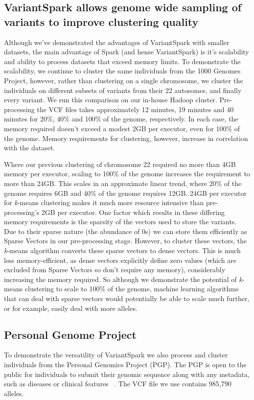 \documentclass{bmcart}
\newcommand{\variantSpark}{{\sc VariantSpark}}
\newcommand{\kMeans}{\textit{k}-means}
\begin{document}
\subsection*{\variantSpark{} allows genome wide sampling of variants to improve clustering quality}

Although we've demonstrated the advantages of \variantSpark{} with smaller datasets, the main advantage of {\sc Spark} (and hense \variantSpark) is it's scalability and ability to process datasets that exceed memory limits.
To demonstrate the scalability, we continue to cluster the same individuals from the 1000 Genomes Project, however, rather than clustering on a single chromosome, we cluster the individuals on different subsets of variants from their 22 autosomes, and finally every variant.
We run this comparison on our in-house Hadoop cluster. Pre-processing the VCF files takes approximately 12 minutes, 19 minutes and 40 minutes for 20\%, 40\% and 100\% of the genome, respectively.
In each case, the memory required doesn't exceed a modest 2GB per executor, even for 100\% of the genome. Memory requirements for clustering, however, increase in correlation with the dataset. 

Where our previous clustering of chromosome 22 required no more than 4GB memory per executor, scaling to 100\% of the genome increases the requirement to more than 24GB. This scales in an approximate linear trend, where 20\% of the genome requires 6GB and 40\% of the genome requires 12GB.
24GB per executor for \kMeans{} clustering makes it much more resource intensive than pre-processing's 2GB per executor. 
One factor which results in these differing memory requirements is the sparsity of the vectors used to store the variants. Due to their sparse nature (the abundance of 0s) we can store them efficiently as Sparse Vectors in our pre-processing stage. However, to cluster these vectors, the \kMeans{} algorithm converts these sparse vectors to dense vectors. This is much less memory-efficient, as dense vectors explicitly define zero values (which are excluded from Sparse Vectors so don't require any memory), considerably increasing the memory required.
So although we demonstrate the potential of \kMeans{} clustering to scale to 100\% of the genome, machine learning algorithms that can deal with sparse vectors would potentially be able to scale much further, or for example, easily deal with more alleles.


\subsection*{Personal Genome Project}
To demonstrate the versatility of \variantSpark{} we also process and cluster individuals from the Personal Genomics Project (PGP). The PGP is open to the public for individuals to submit their genomic sequence along with any metadata, such as diseases or clinical features ~\cite{Lunshof2013}.
The  VCF file we use contains 985,790 alleles.
\end{document}
